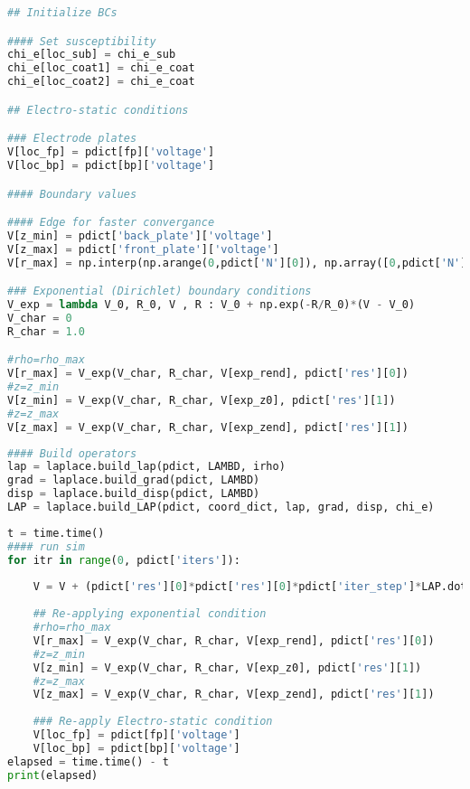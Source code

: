 \begin{lstlisting}[frame=single, language=Python]
## Initialize BCs

#### Set susceptibility
chi_e[loc_sub] = chi_e_sub
chi_e[loc_coat1] = chi_e_coat
chi_e[loc_coat2] = chi_e_coat

## Electro-static conditions

### Electrode plates
V[loc_fp] = pdict[fp]['voltage']
V[loc_bp] = pdict[bp]['voltage']

#### Boundary values

#### Edge for faster convergance
V[z_min] = pdict['back_plate']['voltage']
V[z_max] = pdict['front_plate']['voltage']
V[r_max] = np.interp(np.arange(0,pdict['N'][0]), np.array([0,pdict['N'][0]-1]), np.array([pdict['back_plate']['voltage'], pdict['front_plate']['voltage']]))

### Exponential (Dirichlet) boundary conditions
V_exp = lambda V_0, R_0, V , R : V_0 + np.exp(-R/R_0)*(V - V_0) 
V_char = 0
R_char = 1.0

#rho=rho_max
V[r_max] = V_exp(V_char, R_char, V[exp_rend], pdict['res'][0])
#z=z_min
V[z_min] = V_exp(V_char, R_char, V[exp_z0], pdict['res'][1])
#z=z_max
V[z_max] = V_exp(V_char, R_char, V[exp_zend], pdict['res'][1])
\end{lstlisting}

\begin{lstlisting}[frame=single, language=Python]
#### Build operators
lap = laplace.build_lap(pdict, LAMBD, irho)
grad = laplace.build_grad(pdict, LAMBD)
disp = laplace.build_disp(pdict, LAMBD)
LAP = laplace.build_LAP(pdict, coord_dict, lap, grad, disp, chi_e)
\end{lstlisting}

\begin{lstlisting}[frame=single, language=Python]
t = time.time() 
#### run sim
for itr in range(0, pdict['iters']):
    
    V = V + (pdict['res'][0]*pdict['res'][0]*pdict['iter_step']*LAP.dot(V))
    
    ## Re-applying exponential condition
    #rho=rho_max
    V[r_max] = V_exp(V_char, R_char, V[exp_rend], pdict['res'][0])
    #z=z_min
    V[z_min] = V_exp(V_char, R_char, V[exp_z0], pdict['res'][1])
    #z=z_max
    V[z_max] = V_exp(V_char, R_char, V[exp_zend], pdict['res'][1])
    
    ### Re-apply Electro-static condition
    V[loc_fp] = pdict[fp]['voltage']
    V[loc_bp] = pdict[bp]['voltage']
elapsed = time.time() - t
print(elapsed)
\end{lstlisting}

